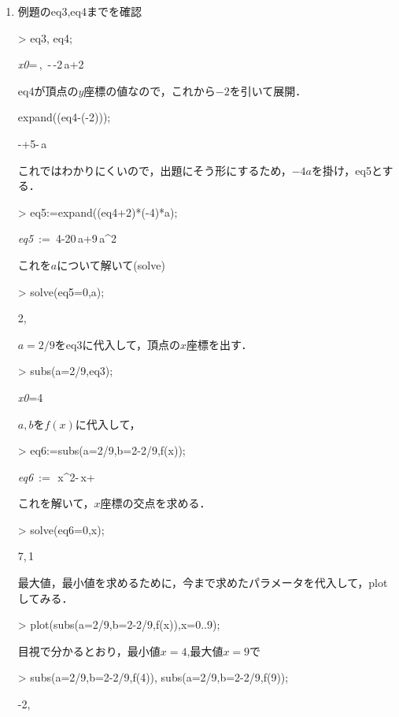 \begin{enumerate}
\item
例題のeq3,eq4までを確認
\begin{MapleInput}
> eq3, eq4;
\end{MapleInput}
\begin{MapleOutput}
{\it x0}=\,{},\, -\,{}-2\,a+2
\end{MapleOutput}
eq4が頂点の$y$座標の値なので，これから$-2$を引いて展開．
\begin{MapleInput}
expand((eq4-(-2)));
\end{MapleInput}
\begin{MapleOutput}
-+5-\,a
\end{MapleOutput}
これではわかりにくいので，出題にそう形にするため，$-4a$を掛け，eq5とする．
\begin{MapleInput}
> eq5:=expand((eq4+2)*(-4)*a);
\end{MapleInput}
\begin{MapleOutput}
{\it eq5}\, := \,4-20\,a+9\,{a}^{2}
\end{MapleOutput}
これを$a$について解いて(solve)
\begin{MapleInput}
> solve(eq5=0,a);
\end{MapleInput}
\begin{MapleOutput}
2,\,
\end{MapleOutput}
$a=2/9$をeq3に代入して，頂点の$x$座標を出す．
\begin{MapleInput}
> subs(a=2/9,eq3);
\end{MapleInput}
\begin{MapleOutput}
{\it x0}=4
\end{MapleOutput}
$a,b$を$f(x)$に代入して，
\begin{MapleInput}
> eq6:=subs({a=2/9,b=2-2/9},f(x));
\end{MapleInput}
\begin{MapleOutput}
{\it eq6}\, := \,\,{x}^{2}-{}\,x+{}
\end{MapleOutput}
これを解いて，$x$座標の交点を求める．
\begin{MapleInput}
> solve(eq6=0,x);
\end{MapleInput}
\begin{MapleOutput}
7,\,1
\end{MapleOutput}
最大値，最小値を求めるために，今まで求めたパラメータを代入して，plotしてみる．
\begin{MapleInput}
> plot(subs({a=2/9,b=2-2/9},f(x)),x=0..9);
\end{MapleInput}
目視で分かるとおり，最小値$x=4$,最大値$x=9$で
\begin{MapleInput}
> subs({a=2/9,b=2-2/9},f(4)), subs({a=2/9,b=2-2/9},f(9));
\end{MapleInput}
\begin{MapleOutput}
-2,\,
\end{MapleOutput}
\end{enumerate}

